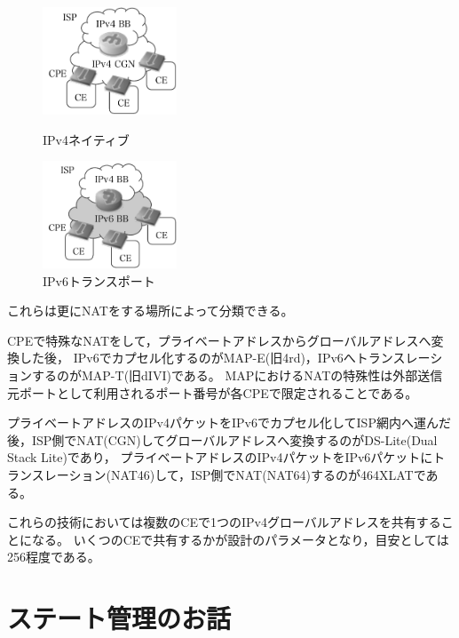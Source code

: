 \begin{figure}[htbp]
 \begin{minipage}{0.5\hsize}
  \begin{center}
   \includegraphics[bb=0 0 175 140,width=40mm]{./yuyarin/cgn.pdf}
  \end{center}
  \caption{IPv4ネイティブ}
  \label{fig:one}
 \end{minipage}
 \begin{minipage}{0.5\hsize}
  \begin{center}
   \includegraphics[bb=0 0 175 140,width=40mm]{./yuyarin/v6transport.pdf}
  \end{center}
  \caption{IPv6トランスポート}
  \label{fig:two}
 \end{minipage}
\end{figure}

これらは更にNATをする場所によって分類できる。

CPEで特殊なNATをして，プライベートアドレスからグローバルアドレスへ変換した後，
IPv6でカプセル化するのがMAP-E(旧4rd)，IPv6へトランスレーションするのがMAP-T(旧dIVI)である。
MAPにおけるNATの特殊性は外部送信元ポートとして利用されるポート番号が各CPEで限定されることである。

プライベートアドレスのIPv4パケットをIPv6でカプセル化してISP網内へ運んだ後，ISP側でNAT(CGN)してグローバルアドレスへ変換するのがDS-Lite(Dual Stack Lite)であり，
プライベートアドレスのIPv4パケットをIPv6パケットにトランスレーション(NAT46)して，ISP側でNAT(NAT64)するのが464XLATである。

これらの技術においては複数のCEで1つのIPv4グローバルアドレスを共有することになる。
いくつのCEで共有するかが設計のパラメータとなり，目安としては256程度である。

\section{ステート管理のお話}

